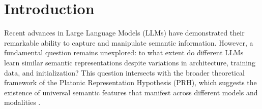 \documentclass[9pt,letterpaper]{article}
\begin{document}




\maketitle %

\thispagestyle{empty} %

\newpage

\section*{Introduction}

Recent advances in Large Language Models (LLMs) have demonstrated their remarkable ability to capture and manipulate semantic information. However, a fundamental question remains unexplored: to what extent do different LLMs learn similar semantic representations despite variations in architecture, training data, and initialization? This question intersects with the broader theoretical framework of the Platonic Representation Hypothesis (PRH), which suggests the existence of universal semantic features that manifest across different models and modalities \cite{huh_platonic_2024}.
\end{document}

